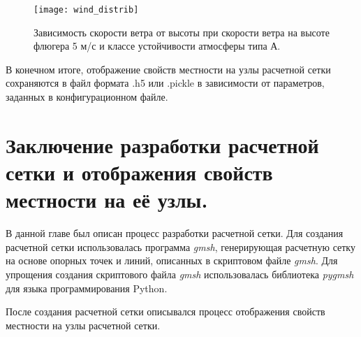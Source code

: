 \begin{figure}[ht]
    \centering
    \texttt{[image: wind\_distrib]}
    \captionsetup{justification=centering}
    \caption{Зависимость скорости ветра от высоты при скорости ветра на высоте флюгера 5 м/с и классе устойчивости 
        атмосферы типа А.}
    \label{fig_wind_distrib}
\end{figure}

В конечном итоге, отображение свойств местности на узлы расчетной сетки сохраняются в файл формата .h5 или .pickle в 
зависимости от параметров, заданных в конфигурационном файле. 

\section{Заключение разработки расчетной сетки и отображения свойств местности на её узлы.}

В данной главе был описан процесс разработки расчетной сетки. Для создания расчетной сетки использовалась программа 
\textit{gmsh}, генерирующая расчетную сетку на основе опорных точек и линий, описанных в скриптовом файле \textit{gmsh}. 
Для упрощения создания скриптового файла \textit{gmsh} использовалась библиотека \textit{pygmsh} для языка 
программирования Python. 

После создания расчетной сетки описывался процесс отображения свойств местности на узлы расчетной сетки.

